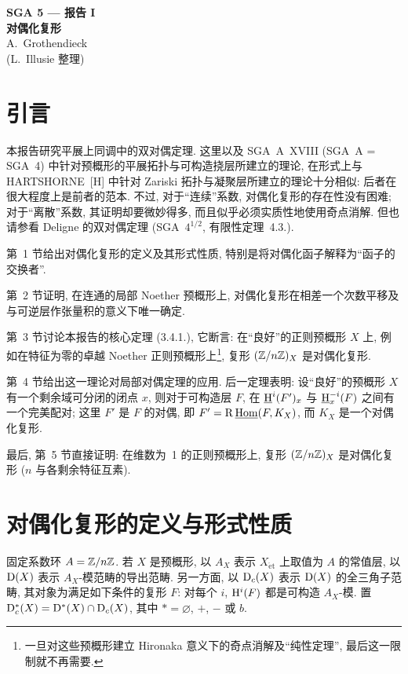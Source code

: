 \clearpage

\begin{center}
{\Large \textbf{SGA 5 --- 报告 I}}\\[0.4em]
{\large \textbf{对偶化复形}}\\[0.3em]
A.~Grothendieck\\
(L.~Illusie 整理)
\end{center}

\section*{引言}

本报告研究平展上同调中的双对偶定理. 这里以及 SGA~A~XVIII (SGA~A = SGA~4) 中针对预概形的平展拓扑与可构造挠层所建立的理论, 在形式上与 HARTSHORNE~[H] 中针对 Zariski 拓扑与凝聚层所建立的理论十分相似: 后者在很大程度上是前者的范本. 不过, 对于“连续”系数, 对偶化复形的存在性没有困难; 对于“离散”系数, 其证明却要微妙得多, 而且似乎必须实质性地使用奇点消解. 但也请参看 Deligne 的双对偶定理 (SGA~$4^{1/2}$, 有限性定理~4.3.).

第~1 节给出对偶化复形的定义及其形式性质, 特别是将对偶化函子解释为“函子的交换者”.

第~2 节证明, 在连通的局部 Noether 预概形上, 对偶化复形在相差一个次数平移及与可逆层作张量积的意义下唯一确定.

第~3 节讨论本报告的核心定理 (3.4.1.), 它断言: 在“良好”的正则预概形 $X$ 上, 例如在特征为零的卓越 Noether 正则预概形上\footnote{一旦对这些预概形建立 Hironaka 意义下的奇点消解及“纯性定理”, 最后这一限制就不再需要.}, 复形 $(\mathbb Z/n\mathbb Z)_X$ 是对偶化复形.

第~4 节给出这一理论对局部对偶定理的应用. 后一定理表明: 设“良好”的预概形 $X$ 有一个剩余域可分闭的闭点 $x$, 则对于可构造层 $F$, 在 $\underline{\mathrm{H}}^i(F')_x$ 与 $\underline{\mathrm{H}}^{-i}_x(F)$ 之间有一个完美配对; 这里 $F'$ 是 $F$ 的对偶, 即 $F' = \mathrm R\,\underline{\operatorname{Hom}}(F,K_X)$, 而 $K_X$ 是一个对偶化复形.

最后, 第~5 节直接证明: 在维数为~1 的正则预概形上, 复形 $(\mathbb Z/n\mathbb Z)_X$ 是对偶化复形 ($n$ 与各剩余特征互素).

\section{对偶化复形的定义与形式性质}

固定系数环 $A = \mathbb Z/n\mathbb Z$. 若 $X$ 是预概形, 以 $A_X$ 表示 $X_{\mathrm{\acute{e}t}}$ 上取值为 $A$ 的常值层, 以 $\mathrm{D}(X)$ 表示 $A_X$-模范畴的导出范畴. 另一方面, 以 $\mathrm{D}_c(X)$ 表示 $\mathrm{D}(X)$ 的全三角子范畴, 其对象为满足如下条件的复形 $F$: 对每个 $i$, $\mathrm{H}^i(F)$ 都是可构造 $A_X$-模. 置 $\mathrm{D}_c^{*}(X) = \mathrm{D}^{*}(X) \cap \mathrm{D}_c(X)$, 其中 $* = \varnothing$, $+$, $-$ 或 $b$.

